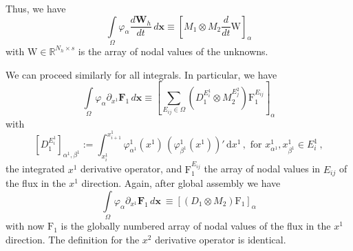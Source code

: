 \documentclass[a4paper,10pt]{article}
\begin{document}
Thus, we have 
$$
\int\limits_{\Omega}\varphi_\alpha \dfrac{d\mathbf{W}_h}{dt}\,d\mathbf{x} \equiv
\left[ M_1\otimes  M_2 \dfrac{d }{dt} \mathrm{W} \right]_{\alpha}
$$
with $ \mathrm{W} \in \mathbb R^{N_h \times s}$ is the array of nodal values  of the unknowns.

We can proceed similarly  for all integrals. In particular, we have
\begin{equation}\label{eq:localDx1}
 \int\limits_{\Omega}\varphi_\alpha  \partial_{x^1}   \mathbf{F}_1 \,d\mathbf{x}  \equiv \left[
  \sum\limits_{E_{ij}\in\Omega}   (D_1^{E_i^{1}}\otimes M_2^{E_j^{2}} ) \mathrm{F}_1^{E_{ij}} \right]_{\alpha}
\end{equation}
with
\begin{equation}\label{eq:localDx2}
\left[ D_1^{E^1_i} \right]_{\alpha^1,\beta^1} :=  \int_{x^1_{i}}^{x^1_{i+1}} \!\!\varphi^1_{\alpha^1}\!(x^1)\, (\varphi^1_{\beta^1}\!(x^1))'\,\mathrm{d}x^1 \,,\text{ for }x^1_{\alpha^1}, x^1_{\beta^1} \in E_i^{1}\,,
\end{equation}
the  integrated $x^1$ derivative operator,  and $\mathrm{F}_1^{E_{ij}}$ the array of nodal values in $E_{ij}$ of the flux in the $x^1$ direction. 
Again, after global assembly we have  
$$
\int\limits_{\Omega}\varphi_\alpha  \partial_{x^1}   \mathbf{F}_1 \,d\mathbf{x} \ \equiv  \left[ (D_1 \otimes M_2)\mathrm{F}_1 \right]_{\alpha}
$$
with now $\mathrm{F}_1$ is the globally numbered array of nodal values of the flux in the $x^1$ direction.
The definition for the $x^2$ derivative operator is identical. 
\end{document}
